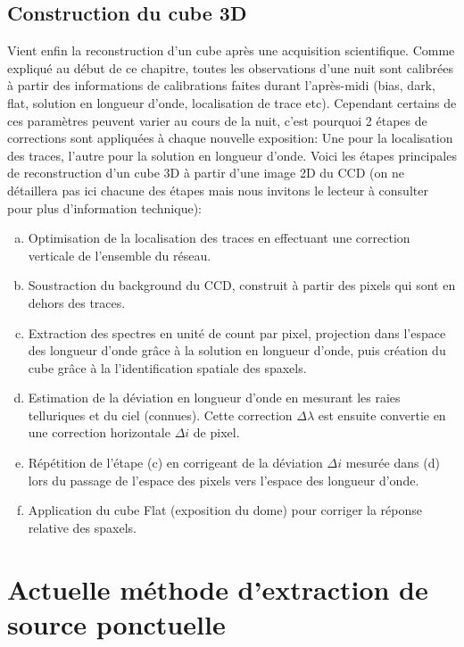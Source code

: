 \documentclass[../main/main.tex]{subfiles}
\begin{document}
\subsection{Construction du cube 3D}\label{ssec:3dcubecons}
Vient enfin la reconstruction d'un cube après une acquisition
scientifique. Comme expliqué au début de ce chapitre,
toutes les observations d'une nuit sont calibrées 
à partir des informations de calibrations faites durant l'après-midi
(bias, dark, flat, solution en longueur d'onde, localisation de trace
etc).
Cependant certains de ces paramètres peuvent varier au cours de la nuit,
c'est pourquoi 2 étapes de corrections sont appliquées à chaque nouvelle
exposition: Une pour la localisation des traces, l'autre pour la
solution en longueur d'onde. Voici les étapes principales de
reconstruction d'un cube 3D à partir d'une image 2D du CCD (on ne
détaillera pas ici chacune des étapes mais nous invitons le lecteur à
consulter \citet{pysedm} pour plus d'information technique):

\begin{enumerate}[(a)]
\itemsep=0em
\item Optimisation de la localisation des traces en effectuant une
  correction verticale de l'ensemble du réseau.
\item Soustraction du background du CCD, construit à partir des pixels
  qui sont en dehors des traces. 
\item Extraction des spectres en unité de count par pixel, projection dans
  l'espace des longueur d'onde grâce à la solution en longueur d'onde,
  puis création du cube grâce à la l'identification spatiale des spaxels.
\item Estimation de la déviation en longueur d'onde en mesurant les
  raies telluriques et du ciel (connues). Cette correction
  $\Delta\lambda$ est ensuite convertie en une correction horizontale
  $\Delta i$ de pixel.
\item Répétition de l'étape (c) en corrigeant de la déviation $\Delta i$
  mesurée dans (d) lors du passage de l'espace des pixels vers l'espace
  des longueur d'onde.
\item Application du cube Flat (exposition du dome) pour corriger la réponse relative des spaxels.
\end{enumerate}

\section{Actuelle méthode d'extraction de source ponctuelle}
\label{ssec:pysedmextractstar}
\end{document}
